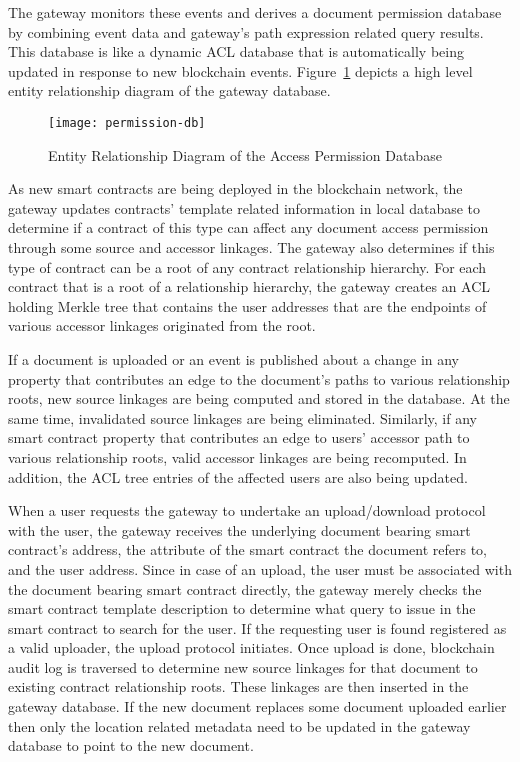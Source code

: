 The gateway monitors these events and derives a document permission database by combining event data and gateway's path expression related query results. This database is like a dynamic ACL database that is automatically being updated in response to new blockchain events. Figure~\ref{fig:perm-ERD} depicts a high level entity relationship diagram of the gateway database.
\begin{figure}[h]
\centering
\texttt{[image: permission-db]}                    
\caption{Entity Relationship Diagram of the Access Permission Database}\label{fig:perm-ERD}
\end{figure}
As new smart contracts are being deployed in the blockchain network, the gateway updates contracts' template related information in local database to determine if a contract of this type can affect any document access permission through some source and accessor linkages. The gateway also determines if this type of contract can be a root of any contract relationship hierarchy. For each contract that is a root of a relationship hierarchy, the gateway creates an ACL holding Merkle tree \cite{6233691} that contains the user addresses that are the endpoints of various accessor linkages originated from the root.

If a document is uploaded or an event is published about a change in any property that contributes an edge to the document's paths to various relationship roots, new source linkages are being computed and stored in the database. At the same time, invalidated source linkages are being eliminated. Similarly, if any smart contract property that contributes an edge to users' accessor path to various relationship roots, valid accessor linkages are being recomputed. In addition, the ACL tree entries of the affected users are also being updated.

When a user requests the gateway to undertake an upload/download protocol with the user, the gateway receives the underlying document bearing smart contract's address, the attribute of the smart contract the document refers to, and the user address. Since in case of an upload, the user must be associated with the document bearing smart contract directly, the gateway merely checks the smart contract template description to determine what query to issue in the smart contract to search for the user. If the requesting user is found registered as a valid uploader, the upload protocol initiates. Once upload is done, blockchain audit log is traversed to determine new source linkages for that document to existing contract relationship roots. These linkages are then inserted in the gateway database. If the new document replaces some document uploaded earlier then only the location related metadata need to be updated in the gateway database to point to the new document.       

